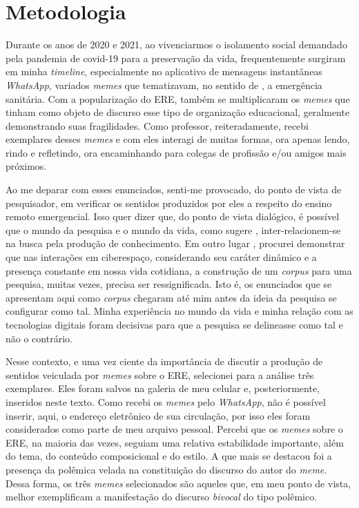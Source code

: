 \documentclass[portuguese]{textolivre}
\begin{document}
	
\section{\textbf{Metodologia}}\label{sec-metodologia}
Durante os anos de 2020 e 2021, ao vivenciarmos o isolamento social demandado pela pandemia de covid-19 para a preservação da vida, frequentemente surgiram em minha \textit{timeline}, especialmente no aplicativo de mensagens instantâneas \textit{WhatsApp}, variados \textit{memes} que tematizavam, no sentido de \textcite{bakhtin2016generos}, a emergência sanitária. Com a popularização do ERE, também se multiplicaram os \textit{memes} que tinham como objeto de discurso esse tipo de organização educacional, geralmente demonstrando suas fragilidades. Como professor, reiteradamente, recebi exemplares desses \textit{memes} e com eles interagi de muitas formas, ora apenas lendo, rindo e refletindo, ora encaminhando para colegas de profissão e/ou amigos mais próximos.
	
Ao me deparar com esses enunciados, senti-me provocado, do ponto de vista de pesquisador, em verificar os sentidos produzidos por eles a respeito do ensino remoto emergencial. Isso quer dizer que, do ponto de vista dialógico, é possível que o mundo da pesquisa e o mundo da vida, como sugere \textcite{bakhtin2017filosofia}, inter-relacionem-se na busca pela produção de conhecimento. Em outro lugar \cite{bastos2022disputas}, procurei demonstrar que nas interações em ciberespaço, considerando seu caráter dinâmico e a presença constante em nossa vida cotidiana, a construção de um \textit{corpus} para uma pesquisa, muitas vezes, precisa ser ressignificada. Isto é, os enunciados que se apresentam aqui como \textit{corpus} chegaram até mim antes da ideia da pesquisa se configurar como tal. Minha experiência no mundo da vida e minha relação com as tecnologias digitais foram decisivas para que a pesquisa se delineasse como tal e não o contrário.
	
Nesse contexto, e uma vez ciente da importância de discutir a produção de sentidos veiculada por \textit{memes} sobre o ERE, selecionei para a análise três exemplares. Eles foram salvos na galeria de meu celular e, posteriormente, inseridos neste texto. Como recebi os \textit{memes} pelo \textit{WhatsApp}, não é possível inserir, aqui, o endereço eletrônico de sua circulação, por isso eles foram considerados como parte de meu arquivo pessoal. Percebi que os \textit{memes} sobre o ERE, na maioria das vezes, seguiam uma relativa estabilidade importante, além do tema, do conteúdo composicional e do estilo. A que mais se destacou foi a presença da polêmica velada na constituição do discurso do autor do \textit{meme}. Dessa forma, os três \textit{memes} selecionados são aqueles que, em meu ponto de vista, melhor exemplificam a manifestação do discurso \textit{bivocal} do tipo polêmico.
	
\end{document}
